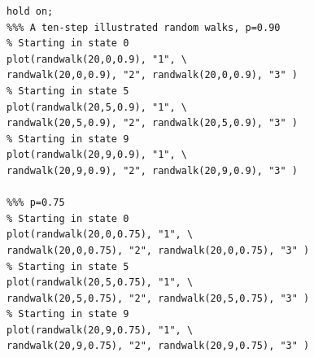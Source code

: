 \begin{verbatim}
hold on;
%%% A ten-step illustrated random walks, p=0.90
% Starting in state 0
plot(randwalk(20,0,0.9), "1", \
randwalk(20,0,0.9), "2", randwalk(20,0,0.9), "3" )
% Starting in state 5
plot(randwalk(20,5,0.9), "1", \
randwalk(20,5,0.9), "2", randwalk(20,5,0.9), "3" )
% Starting in state 9
plot(randwalk(20,9,0.9), "1", \
randwalk(20,9,0.9), "2", randwalk(20,9,0.9), "3" )

%%% p=0.75
% Starting in state 0
plot(randwalk(20,0,0.75), "1", \
randwalk(20,0,0.75), "2", randwalk(20,0,0.75), "3" )
% Starting in state 5
plot(randwalk(20,5,0.75), "1", \
randwalk(20,5,0.75), "2", randwalk(20,5,0.75), "3" )
% Starting in state 9
plot(randwalk(20,9,0.75), "1", \
randwalk(20,9,0.75), "2", randwalk(20,9,0.75), "3" )

\end{verbatim}

